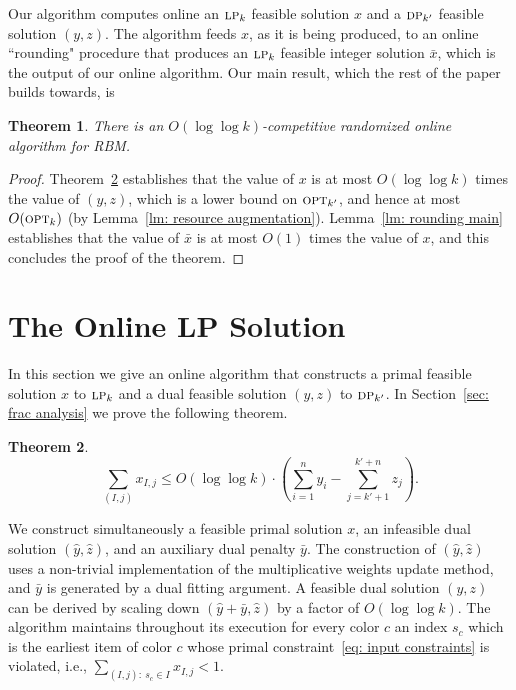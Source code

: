 \documentclass[12pt]{article}
\newtheorem{theorem}{Theorem}[section]
\newcommand{\opt}{{\hbox{\sc opt}}}
\newcommand{\LP}{{\hbox{\sc lp}}}
\newcommand{\DP}{{\hbox{\sc dp}}}
\begin{document}
Our algorithm computes online an $\LP_k$ feasible solution
$x$ and a $\DP_{k'}$ feasible solution $(y,z)$. The algorithm
feeds $x$, as it is being produced, to an online ``rounding"
procedure that produces an $\LP_k$ feasible integer solution
$\bar{x}$, which is the output of our online algorithm. Our
main result, which the rest of the paper builds towards, is
\begin{theorem}
There is an $O(\log\log k)$-competitive randomized online
algorithm for RBM.
\end{theorem}

\begin{proof}
Theorem~\ref{thm: main} establishes that the value of $x$
is at most $O(\log\log k)$ times the value of $(y,z)$, which
is a lower bound on $\opt_{k'}$, and hence at most
$O(\opt_k)$ (by Lemma~\ref{lm: resource augmentation}). 
Lemma~\ref{lm: rounding main} establishes that
the value of $\bar{x}$ is at most $O(1)$ times the value
of $x$, and this concludes the proof of the theorem.
\end{proof}



\section{The Online LP Solution}\label{sec: online lp}

In this section we give an online algorithm that constructs
a primal feasible solution $x$ to $\LP_k$ and a dual feasible
solution $(y,z)$ to $\DP_{k'}$. In Section~\ref{sec: frac analysis}
we prove the following theorem.
\begin{theorem}\label{thm: main}
$$
\sum_{(I,j)} x_{I,j}\le O(\log\log k)\cdot
\left(\sum_{i=1}^{n} y_i - \sum_{j=k'+1}^{k'+n}z_j\right).
$$
\end{theorem}

We construct simultaneously a feasible primal solution
$x$, an infeasible dual solution $(\hat{y},\hat{z})$,
and an auxiliary dual penalty $\bar{y}$. The construction
of $(\hat{y},\hat{z})$ uses a non-trivial implementation of 
the multiplicative weights update method, and $\bar{y}$ is
generated by a dual fitting argument.
A feasible dual solution $(y,z)$ can be derived by scaling
down $(\hat{y}+\bar{y},\hat{z})$ by a factor of $O(\log\log k)$.
The algorithm maintains throughout its execution for
every color $c$ an index $s_c$ which is the earliest item
of color $c$ whose primal constraint~\eqref{eq: input constraints}
is violated, i.e., $\sum_{(I,j):\ s_c\in I} x_{I,j} < 1$.
\end{document}
